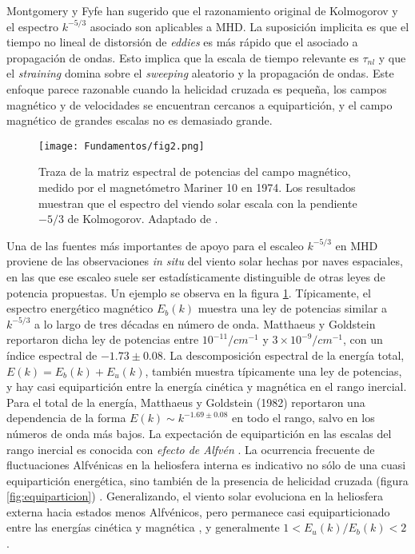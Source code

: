 Montgomery y Fyfe \cite{fyfe_high-beta_1976} han sugerido que el
razonamiento original de Kolmogorov y el espectro $k^{-5/3}$ asociado
son aplicables a MHD. La suposición implicita es que el tiempo no
lineal de distorsión de \textit{eddies} es más rápido que el asociado
a propagación de ondas. Esto implica que la escala de tiempo relevante
es $\tau_{nl}$ y que el \textit{straining} domina sobre el
\textit{sweeping} aleatorio y la propagación de ondas. Este enfoque
parece razonable cuando la helicidad cruzada es pequeña, los campos
magnético y de velocidades se encuentran cercanos a equipartición, y
el campo magnético de grandes escalas no es demasiado grande.

\begin{figure}[h]
  \centering
  \texttt{[image: Fundamentos/fig2.png]}
  \caption{Traza de la matriz espectral de potencias del campo
    magnético, medido por el magnetómetro Mariner 10 en 1974. Los
    resultados muestran que el espectro del viendo solar escala con la
    pendiente $-5/3$ de Kolmogorov. Adaptado de
    \cite{goldstein_magnetohydrodynamic_1995}.}
  \label{fig:experimentalcascade}
\end{figure}

Una de las fuentes más importantes de apoyo para el escaleo $k^{-5/3}$
en MHD proviene de las observaciones \textit{in situ} del viento solar
hechas por naves espaciales, en las que ese escaleo suele ser
estadísticamente distinguible de otras leyes de potencia
propuestas. Un ejemplo se observa en la figura
\ref{fig:experimentalcascade}. Típicamente, el espectro energético
magnético $E_b(k)$ muestra una ley de potencias similar a $k^{-5/3}$ a
lo largo de tres décadas en número de onda. Matthaeus y Goldstein
\cite{matthaeus_measurement_1982} reportaron dicha ley de potencias
entre $10^{-11}/cm^{-1}$ y $3\times 10^{-9}/cm^{-1}$, con un índice
espectral de $-1.73\pm0.08$. La descomposición espectral de la energía
total, $E(k) = E_b(k) + E_u(k)$, también muestra típicamente una ley
de potencias, y hay casi equipartición entre la energía cinética y
magnética en el rango inercial. Para el total de la energía, Matthaeus
y Goldstein \cite{matthaeus_measurement_1982} (1982) reportaron una
dependencia de la forma $E(k)\sim k^{-1.69\pm0.08}$ en todo el rango,
salvo en los números de onda más bajos. La expectación de
equipartición en las escalas del rango inercial es conocida con
\textit{efecto de Alfv\'en} \cite{kraichnan_inertial-range_1965}. La
ocurrencia frecuente de fluctuaciones Alfv\'enicas en la heliosfera
interna es indicativo no sólo de una cuasi equipartición energética,
sino también de la presencia de helicidad cruzada (figura
\ref{fig:equiparticion}) \cite{coleman_turbulence_1968,
  dobrowolny_fully_1980, grappin_alfvenic_1982,
  grappin_dependence_1983, pouquet_growth_1986}. Generalizando, el
viento solar evoluciona en la heliosfera externa hacia estados menos
Alfv\'enicos, pero permanece casi equiparticionado entre las energías
cinética y magnética \cite{roberts_origin_1987,
  roberts_amplitudes_1990}, y generalmente $1<E_u(k)/E_b(k)<2$.


